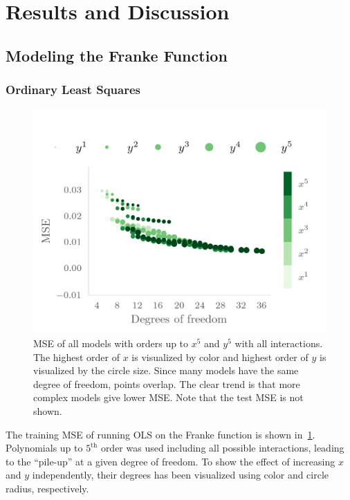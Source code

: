 \section{Results and Discussion}\label{sec:Discussion}

\subsection{Modeling the Franke Function}
\label{sec:model-franke-funct}

\subsubsection{Ordinary Least Squares}
\begin{figure}[]
  \centering
  \includegraphics[]{figures/ols_group.png}
  \caption{\label{fig:olscgrouped} MSE of all models with orders up to \(x^{5}\)
  and \(y^{5}\) with all interactions. The highest order of \(x\) is visualized
  by color and highest order of \(y\) is visualized by the circle size. Since many
  models have the same degree of freedom, points overlap. The clear trend is
  that more complex models give lower MSE. Note that the test MSE is not shown.}
\end{figure}

The training MSE of running OLS on the Franke function is shown
in~\cref{fig:olscgrouped}. Polynomials up to \(5^{\text{th}}\) order was used including all possible
interactions, leading to the ``pile-up'' at a given degree of freedom. To show
the effect of increasing \(x\) and \(y\) independently, their degrees has been
visualized using color and circle radius, respectively.

